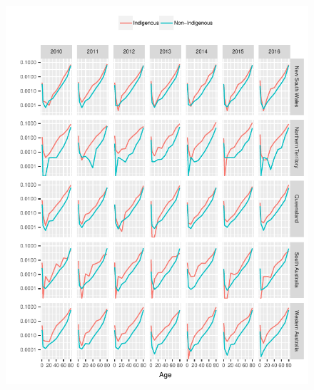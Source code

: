 \documentclass{article}
\begin{document}
\begin{figure}
  \centering
  \includegraphics{out/fig_rates_direct_Female}
\end{figure}
\newpage
\end{document}
